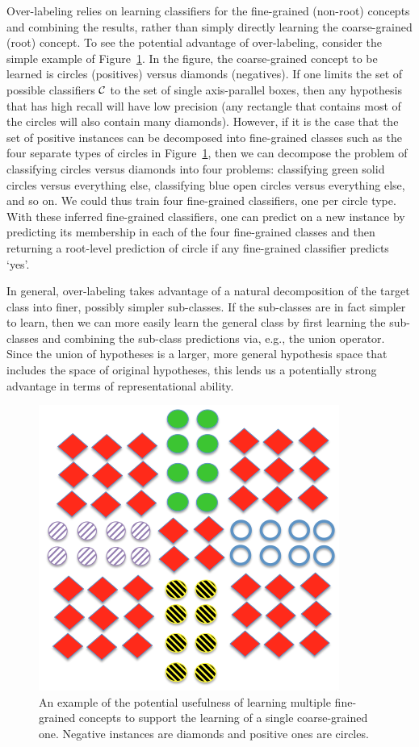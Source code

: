 \documentclass[10pt,conference,compsocconf]{IEEEtran}
\begin{document}
Over-labeling relies on learning classifiers for the fine-grained (non-root)
concepts and combining the results, rather than simply directly learning the
coarse-grained (root) concept.  To see the potential advantage of over-labeling,
consider the simple example of
Figure~\ref{fig:unionex}.  In the figure, the coarse-grained concept
to be learned is circles (positives) versus diamonds (negatives).
If one limits the set of possible classifiers $\cal C$ to the set
of single axis-parallel boxes, then any hypothesis that has high recall
will have low precision (any rectangle that contains most of the circles will also
contain many diamonds).  However, if it is the case that the set
of positive instances can be decomposed into fine-grained classes
such as the four separate types of circles in Figure~\ref{fig:unionex},
then we can decompose the problem of classifying circles versus diamonds
into four problems: classifying green solid circles versus
everything else, classifying blue open circles versus everything
else, and so on.  We could thus train four fine-grained classifiers,
one per circle type.  With these inferred fine-grained classifiers,
one can predict on a new instance by predicting
its membership in each of the four fine-grained classes and then
returning a  root-level prediction of circle if any
fine-grained classifier predicts `yes'.  

In general, over-labeling takes advantage of a natural decomposition of the
target class into finer, possibly simpler sub-classes.  If the sub-classes
are in fact simpler to learn, then we can more easily learn the general class
by first learning the sub-classes and combining the sub-class predictions via, e.g., the 
union operator.  Since the union of hypotheses is a larger, more general
hypothesis space that includes the space of original hypotheses, this lends us
a potentially strong advantage in terms of representational ability.

\begin{figure}[ht]
\vskip 0.2in
\begin{center}
\centerline{\includegraphics[width=2.in]{fig/union.png}}
\caption{ An example of the potential usefulness of learning multiple
fine-grained concepts to support
the learning of a single coarse-grained one.  Negative instances are diamonds and 
positive ones are circles. 
}
\label{fig:unionex}
\end{center}
\vskip -0.2in
\end{figure} 
\end{document}
